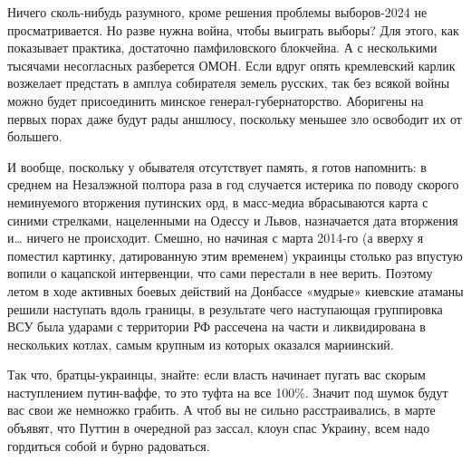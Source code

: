 Ничего сколь-нибудь разумного, кроме решения проблемы выборов-2024 не
просматривается. Но разве нужна война, чтобы выиграть выборы? Для этого, как
показывает практика, достаточно памфиловского блокчейна. А с несколькими
тысячами несогласных разберется ОМОН. Если вдруг опять кремлевский карлик
возжелает предстать в амплуа собирателя земель русских, так без всякой войны
можно будет присоединить минское генерал-губернаторство. Аборигены на первых
порах даже будут рады аншлюсу, поскольку меньшее зло освободит их от большего.

И вообще, поскольку у обывателя отсутствует память, я готов напомнить: в
среднем на Незалэжной полтора раза в год случается истерика по поводу скорого
неминуемого вторжения путинских орд, в масс-медиа вбрасываются карта с синими
стрелками, нацеленными на Одессу и Львов, назначается дата вторжения и… ничего
не происходит. Смешно, но начиная с марта 2014-го (а вверху я поместил
картинку, датированную этим временем) украинцы столько раз впустую вопили о
кацапской интервенции, что сами перестали в нее верить. Поэтому летом в ходе
активных боевых действий на Донбассе «мудрые» киевские атаманы решили наступать
вдоль границы, в результате чего наступающая группировка ВСУ была ударами с
территории РФ рассечена на части и ликвидирована в нескольких котлах, самым
крупным из которых оказался мариинский.

Так что, братцы-украинцы, знайте: если власть начинает пугать вас скорым
наступлением путин-ваффе, то это туфта на все 100\%. Значит под шумок будут вас
свои же немножко грабить. А чтоб вы не сильно расстраивались, в марте объявят,
что Путтин в очередной раз зассал, клоун спас Украину, всем надо гордиться
собой и бурно радоваться.
